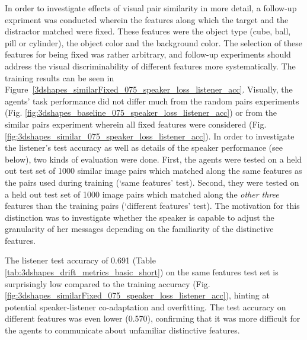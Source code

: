 In order to investigate effects of visual pair similarity in more detail, a follow-up expriment was conducted wherein the features along which the target and the distractor matched were fixed. These features were the object type (cube, ball, pill or cylinder), the object color and the background color. The selection of these features for being fixed was rather arbitrary, and follow-up experiments should address the visual discriminability of different features more systematically. The training results can be seen in Figure~\ref{3dshapes_similarFixed_075_speaker_loss_listener_acc}. Visually, the agents' task performance did not differ much from the random pairs experiments (Fig. \ref{fig:3dshapes_baseline_075_speaker_loss_listener_acc}) or from the similar pairs experiment wherein all fixed features were considered (Fig. \ref{fig:3dshapes_similar_075_speaker_loss_listener_acc}). In order to investigate the listener's test accuracy as well as details of the speaker performance (see below), two kinds of evaluation were done. First, the agents were tested on a held out test set of 1000 similar image pairs which matched along the same features as the pairs used during training (`same features' test). Second, they were tested on a held out test set of 1000 image pairs which matched along the \emph{other three} features than the training pairs (`different features' test). The motivation for this distinction was to investigate whether the speaker is capable to adjust the granularity of her messages depending on the familiarity of the distinctive features.

The listener test accuracy of 0.691 (Table \ref{tab:3dshapes_drift_metrics_basic_short}) on the same features test set is surprisingly low compared to the training accuracy (Fig. \ref{fig:3dshapes_similarFixed_075_speaker_loss_listener_acc}), hinting at potential speaker-listener co-adaptation and overfitting. The test accuracy on different features was even lower (0.570), confirming that it was more difficult for the agents to communicate about unfamiliar distinctive features. 

